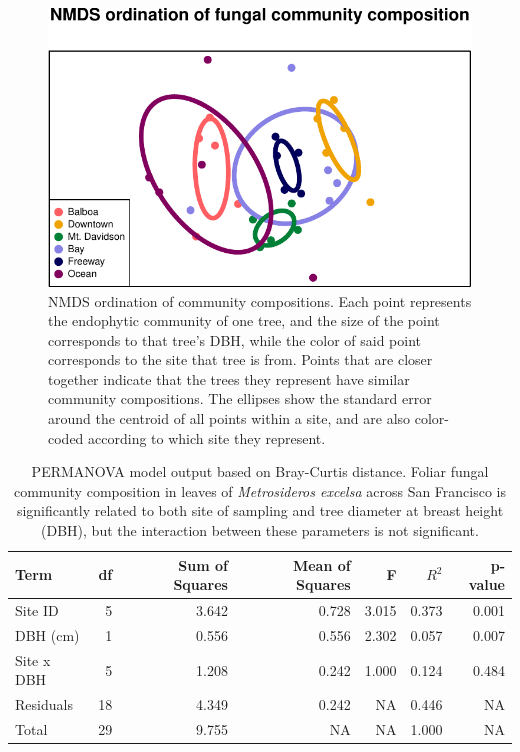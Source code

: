 \documentclass[fleqn,10pt,lineno]{wlpeerj} %
\begin{document}
\begin{figure}
\centering
\includegraphics{gibson2023_files/figure-latex/nmds-plot-1.pdf}
\caption{\label{fig:nmds-plot}NMDS ordination of community compositions. Each point represents the endophytic community of one tree, and the size of the point corresponds to that tree's DBH, while the color of said point corresponds to the site that tree is from. Points that are closer together indicate that the trees they represent have similar community compositions. The ellipses show the standard error around the centroid of all points within a site, and are also color-coded according to which site they represent.}
\end{figure}

\begin{table}[!h]

\caption{\label{tab:permanova-table}PERMANOVA model output based on Bray-Curtis distance. Foliar fungal community composition in leaves of \emph{Metrosideros excelsa} across San Francisco is significantly related to both site of sampling and tree diameter at breast height (DBH), but the interaction between these parameters is not significant.}
\centering
\begin{tabular}[t]{lrrrrrr}
\toprule
Term & df & Sum of Squares & Mean of Squares & F & $R^{2}$ & p-value\\
\midrule
Site ID & 5 & 3.642 & 0.728 & 3.015 & 0.373 & 0.001\\
DBH (cm) & 1 & 0.556 & 0.556 & 2.302 & 0.057 & 0.007\\
Site x DBH & 5 & 1.208 & 0.242 & 1.000 & 0.124 & 0.484\\
Residuals & 18 & 4.349 & 0.242 & NA & 0.446 & NA\\
Total & 29 & 9.755 & NA & NA & 1.000 & NA\\
\bottomrule
\end{tabular}
\end{table}
\end{document}
